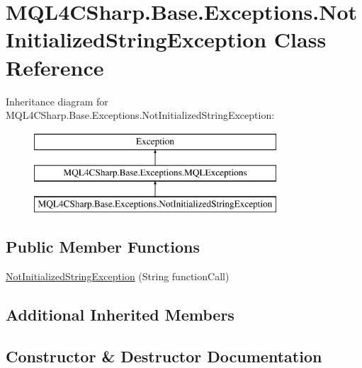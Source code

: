 \hypertarget{class_m_q_l4_c_sharp_1_1_base_1_1_exceptions_1_1_not_initialized_string_exception}{}\section{M\+Q\+L4\+C\+Sharp.\+Base.\+Exceptions.\+Not\+Initialized\+String\+Exception Class Reference}
\label{class_m_q_l4_c_sharp_1_1_base_1_1_exceptions_1_1_not_initialized_string_exception}
Inheritance diagram for M\+Q\+L4\+C\+Sharp.\+Base.\+Exceptions.\+Not\+Initialized\+String\+Exception\+:\begin{figure}[H]
\begin{center}
\leavevmode
\includegraphics[height=3.000000cm]{class_m_q_l4_c_sharp_1_1_base_1_1_exceptions_1_1_not_initialized_string_exception}
\end{center}
\end{figure}
\subsection*{Public Member Functions}
\begin{DoxyCompactItemize}
\item 
\hyperlink{class_m_q_l4_c_sharp_1_1_base_1_1_exceptions_1_1_not_initialized_string_exception_af6252cc0d9fdfb1779105c33c817e123}{Not\+Initialized\+String\+Exception} (String function\+Call)
\end{DoxyCompactItemize}
\subsection*{Additional Inherited Members}


\subsection{Constructor \& Destructor Documentation}
